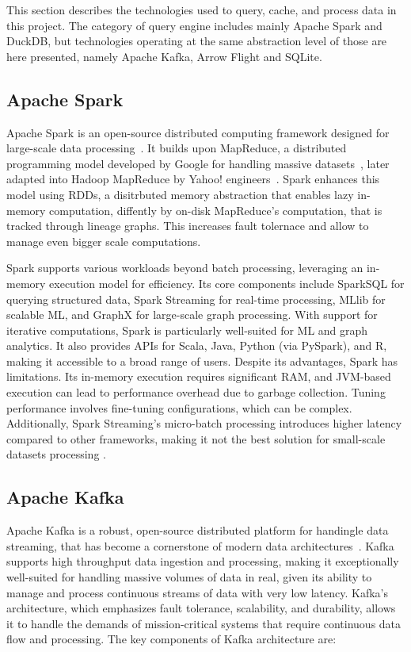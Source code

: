 This section describes the technologies used to query, cache, and process data in this project. The category of query engine includes mainly Apache Spark and DuckDB, but technologies operating at the same abstraction level of those are here presented, namely Apache Kafka, Arrow Flight and SQLite. 

\subsection{Apache Spark}
Apache Spark is an open-source distributed computing framework designed for large-scale data processing~\cite{zahariaApacheSparkUnified2016}. It builds upon MapReduce, a distributed programming model developed by Google for handling massive datasets~\cite{dean2004mapreduce}, later adapted into Hadoop MapReduce by Yahoo! engineers~\cite{borthakurHadoopDistributedFile2005}. Spark enhances this model using \glspl{RDD}\cite{Zaharia:EECS-2011-82}, a disitrbuted memory abstraction that enables lazy in-memory computation, diffently by on-disk MapReduce's computation, that is tracked through lineage graphs. This increases fault tolernace \cite{Zaharia:EECS-2011-82} and allow to manage even bigger scale computations.

Spark supports various workloads beyond batch processing, leveraging an in-memory execution model for efficiency. Its core components include SparkSQL for querying structured data, Spark Streaming for real-time processing, MLlib for scalable \gls{ML}, and GraphX for large-scale graph processing. With support for iterative computations, Spark is particularly well-suited for \gls{ML} and graph analytics. It also provides \glspl{API} for Scala, Java, Python (via PySpark), and R, making it accessible to a broad range of users. Despite its advantages, Spark has limitations. Its in-memory execution requires significant RAM, and \gls{JVM}-based execution can lead to performance overhead due to garbage collection. Tuning performance involves fine-tuning configurations, which can be complex. Additionally, Spark Streaming's micro-batch processing introduces higher latency compared to other frameworks, making it not the best solution for small-scale datasets processing \cite{BenchmarkResultsSpark}.

\subsection{Apache Kafka}

Apache Kafka is a robust, open-source distributed platform for handingle data streaming, that has become a cornerstone of modern data architectures~\cite{krepsKafkaDistributedMessaging2011}. Kafka supports high throughput data ingestion and processing, making it exceptionally well-suited for handling massive volumes of data in real, given its ability to manage and process continuous streams of data with very low latency. Kafka's architecture, which emphasizes fault tolerance, scalability, and durability, allows it to handle the demands of mission-critical systems that require continuous data flow and processing.  The key components of Kafka architecture are:

